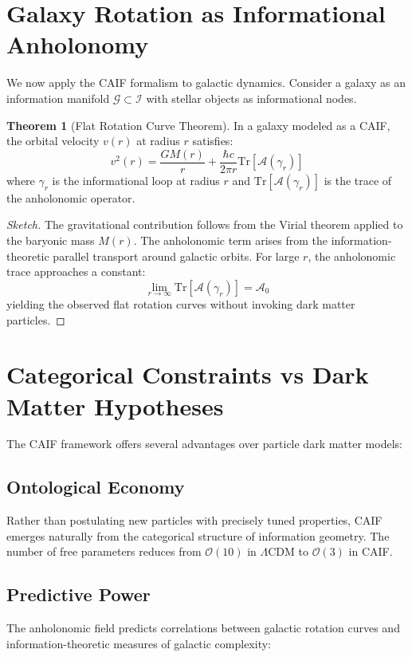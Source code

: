 \documentclass[11pt]{article}
\theoremstyle{definition}
\newtheorem{theorem}{Theorem}[section]
\theoremstyle{remark}
\begin{document}
\section{Galaxy Rotation as Informational Anholonomy}

We now apply the CAIF formalism to galactic dynamics. Consider a galaxy as an information manifold \( \mathcal{G} \subset \mathcal{I} \) with stellar objects as informational nodes.

\begin{theorem}[Flat Rotation Curve Theorem]
In a galaxy modeled as a CAIF, the orbital velocity \( v(r) \) at radius \( r \) satisfies:
\[ v^2(r) = \frac{GM(r)}{r} + \frac{\hbar c}{2\pi r} \text{Tr}[\mathcal{A}(\gamma_r)] \]
where \( \gamma_r \) is the informational loop at radius \( r \) and \( \text{Tr}[\mathcal{A}(\gamma_r)] \) is the trace of the anholonomic operator.
\end{theorem}

\begin{proof}[Sketch]
The gravitational contribution follows from the Virial theorem applied to the baryonic mass \( M(r) \). The anholonomic term arises from the information-theoretic parallel transport around galactic orbits. For large \( r \), the anholonomic trace approaches a constant:
\[ \lim_{r \to \infty} \text{Tr}[\mathcal{A}(\gamma_r)] = \mathcal{A}_0 \]
yielding the observed flat rotation curves without invoking dark matter particles.
\end{proof}

\section{Categorical Constraints vs Dark Matter Hypotheses}

The CAIF framework offers several advantages over particle dark matter models:

\subsection{Ontological Economy}
Rather than postulating new particles with precisely tuned properties, CAIF emerges naturally from the categorical structure of information geometry. The number of free parameters reduces from \( \mathcal{O}(10) \) in $\Lambda$CDM to \( \mathcal{O}(3) \) in CAIF.

\subsection{Predictive Power}
The anholonomic field predicts correlations between galactic rotation curves and information-theoretic measures of galactic complexity:
\end{document}
